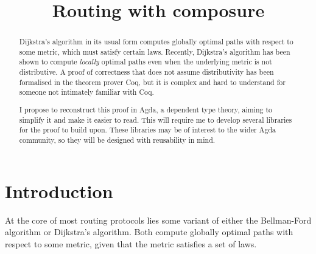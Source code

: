 \documentclass[a4paper]{scrartcl}
\title{\phantomsection%
  Routing with composure%
  \label{generalised-big-operators-in-agda}}
\author{}
\date{}
\begin{document}
\maketitle

% 
% 
% 


\begin{abstract}
Dijkstra's algorithm in its usual form computes globally optimal paths with respect to some metric, which must satisfy certain laws. Recently, Dijkstra's algorithm has been shown to compute \emph{locally} optimal paths even when the underlying metric is not distributive. A proof of correctness that does not assume distributivity has been formalised in the theorem prover Coq, but it is complex and hard to understand for someone not intimately familiar with Coq.

I propose to reconstruct this proof in Agda, a dependent type theory, aiming to simplify it and make it easier to read. This will require me to develop several libraries for the proof to build upon. These libraries may be of interest to the wider Agda community, so they will be designed with reusability in mind.
\end{abstract}

\section{Introduction%
  \label{introduction}%
}

At the core of most routing protocols lies some variant of either the Bellman-Ford algorithm or Dijkstra's algorithm. Both compute globally optimal paths with respect to some metric, given that the metric satisfies a set of laws.
\end{document}

